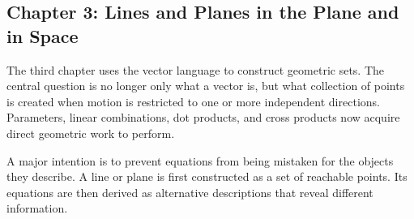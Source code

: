 \subsection*{Chapter 3: Lines and Planes in the Plane and in Space}

The third chapter uses the vector language to construct geometric sets. The
central question is no longer only what a vector is, but what collection of
points is created when motion is restricted to one or more independent
directions. Parameters, linear combinations, dot products, and cross products
now acquire direct geometric work to perform.

A major intention is to prevent equations from being mistaken for the objects
they describe. A line or plane is first constructed as a set of reachable points.
Its equations are then derived as alternative descriptions that reveal different
information.




